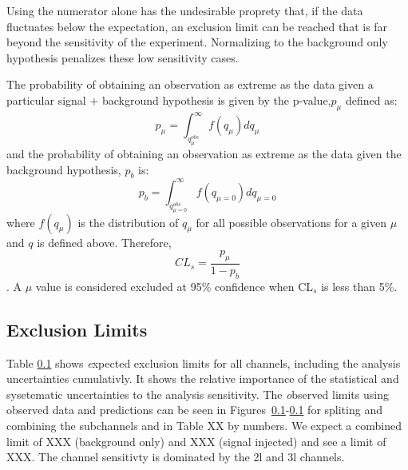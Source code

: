 Using the numerator alone has the undesirable proprety that, if the data fluctuates below the expectation, an exclusion limit can be reached that is far beyond the sensitivity of the experiment. Normalizing to the background only hypothesis penalizes these low sensitivity cases.

The probability of obtaining an observation as extreme as the data given a particular signal $+$ background hypothesis is given by the p-value,$p_{\mu}$ defined as:
\begin{equation}
 p_{\mu} = \int_{q_{\mu}^{obs}}^{\infty} f(q_{\mu}) dq_{\mu}
\end{equation}
and the probability of obtaining an observation as extreme as the data given the background hypothesis, $p_b$ is:
\begin{equation}
 p_{b} = \int_{q_{\mu=0}^{obs}}^{\infty} f(q_{\mu=0}) dq_{\mu=0}
\end{equation}
where $f(q_{\mu})$ is the distribution of $q_{\mu}$ for all possible observations for a given $\mu$ and $q$ is defined above. Therefore,
\begin{equation}
 CL_{s} = \frac{p_{\mu}}{1-p_b}
\end{equation}
. A $\mu$ value is considered excluded at 95\% confidence when CL$_{s}$ is less than 5\%. 

\subsection{Exclusion Limits}

Table \ref{} shows {\textit expected} exclusion limits for all channels, including the analysis uncertainties cumulativly. It shows the relative importance of the statistical and sysetematic uncertainties to the analysis sensitivity. The {\textit observed} limits using observed data and predictions can be seen in Figures~\ref{}-\ref{} for spliting and combining the subchannels and in Table XX by numbers. We expect a combined limit of XXX (background only) and XXX (signal injected) and see a limit of XXX. The channel sensitivty is dominated by the 2l and 3l channels.

